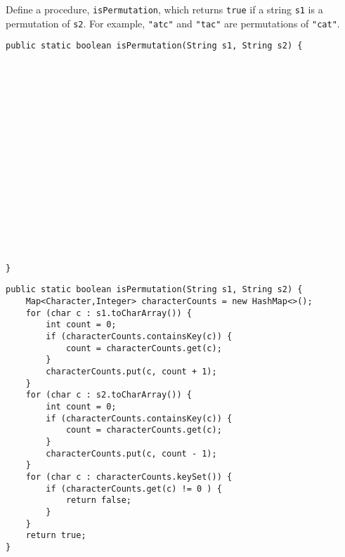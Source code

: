\begin{blocksection}
\question Define a procedure, \lstinline$isPermutation$, which returns
\lstinline$true$ if a string \lstinline$s1$ is a permutation of \lstinline$s2$.
For example, \lstinline$"atc"$ and \lstinline$"tac"$ are permutations of
\lstinline$"cat"$.

\ifprintanswers\else
\begin{lstlisting}
public static boolean isPermutation(String s1, String s2) {


















}
\end{lstlisting}
\fi

\begin{solution}
\begin{lstlisting}
public static boolean isPermutation(String s1, String s2) {
    Map<Character,Integer> characterCounts = new HashMap<>();
    for (char c : s1.toCharArray()) {
        int count = 0;
        if (characterCounts.containsKey(c)) {
            count = characterCounts.get(c);
        }
        characterCounts.put(c, count + 1);
    }
    for (char c : s2.toCharArray()) {
        int count = 0;
        if (characterCounts.containsKey(c)) {
            count = characterCounts.get(c);
        }
        characterCounts.put(c, count - 1);
    }
    for (char c : characterCounts.keySet()) {
        if (characterCounts.get(c) != 0 ) {
            return false;
        }
    }
    return true;
}
\end{lstlisting}
\end{solution}
\end{blocksection}

